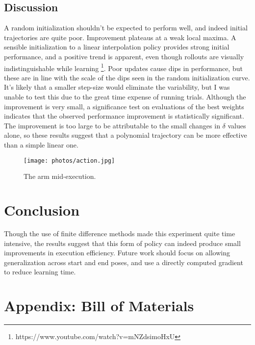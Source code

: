 \documentclass{article}
\begin{document}
	
\subsection{Discussion}

A random initialization shouldn't be expected to perform well, and indeed initial trajectories are quite poor. Improvement plateaus at a weak local maxima. A sensible initialization to a linear interpolation policy provides strong initial performance, and a positive trend is apparent, even though rollouts are visually indistinguishable while learning \footnote{https://www.youtube.com/watch?v=mNZdsimoHxU}. Poor updates cause dips in performance, but these are in line with the scale of the dips seen in the random initialization curve. It's likely that a smaller step-size would eliminate the variability, but I was unable to test this due to the great time expense of running trials. Although the improvement is very small, a significance test on evaluations of the best weights indicates that the observed performance improvement is statistically significant. The improvement is too large to be attributable to the small changes in $\delta$ values alone, so these results suggest that a polynomial trajectory can be more effective than a simple linear one.


	\begin{figure}[!htb]
		\centering
		\texttt{[image: photos/action.jpg]}
		\caption{The arm mid-execution.}
	\end{figure}



\section{Conclusion}

Though the use of finite difference methods made this experiment quite time intensive, the results suggest that this form of policy can indeed produce small improvements in execution efficiency. Future work should focus on allowing generalization across start and end poses, and use a directly computed gradient to reduce learning time.

\clearpage


\section{Appendix: Bill of Materials}
\end{document}
